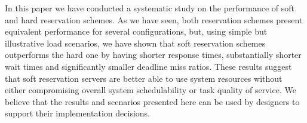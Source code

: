 \documentclass[12pt]{article}
\begin{document}
In this paper we have conducted a systematic study on the performance
of soft and hard reservation schemes. As we have seen, both
reservation schemes present equivalent performance for several
configurations, but, using simple but illustrative load scenarios, we
have shown that soft reservation schemes outperforms the hard one by
having shorter response times, substantially shorter wait times and
significantly smaller deadline miss ratios. These results suggest that
soft reservation servers are better able to use system resources
without either compromising overall system schedulability or task
quality of service. We believe that the results and scenarios
presented here can be used by designers to support their
implementation decisions.



\end{document}

